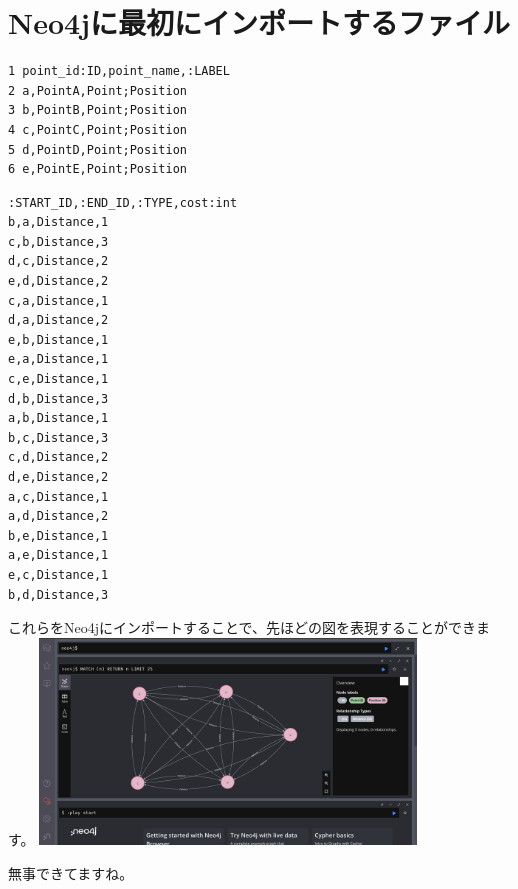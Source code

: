 \section{Neo4jに最初にインポートするファイル}

\begin{tcolorbox}[title=point.csv]
    \begin{verbatim}
1 point_id:ID,point_name,:LABEL
2 a,PointA,Point;Position
3 b,PointB,Point;Position
4 c,PointC,Point;Position
5 d,PointD,Point;Position
6 e,PointE,Point;Position
\end{verbatim}
\end{tcolorbox}


\begin{tcolorbox}[title=route.csv]
    \begin{verbatim}
:START_ID,:END_ID,:TYPE,cost:int
b,a,Distance,1
c,b,Distance,3
d,c,Distance,2
e,d,Distance,2
c,a,Distance,1
d,a,Distance,2
e,b,Distance,1
e,a,Distance,1
c,e,Distance,1
d,b,Distance,3
a,b,Distance,1
b,c,Distance,3
c,d,Distance,2
d,e,Distance,2
a,c,Distance,1
a,d,Distance,2
b,e,Distance,1
a,e,Distance,1
e,c,Distance,1
b,d,Distance,3
\end{verbatim}
\end{tcolorbox}
これらをNeo4jにインポートすることで、先ほどの図を表現することができます。
\includegraphics[width=10cm]{./image/03-Tech/chap3/neo4j_result.png}

無事できてますね。

